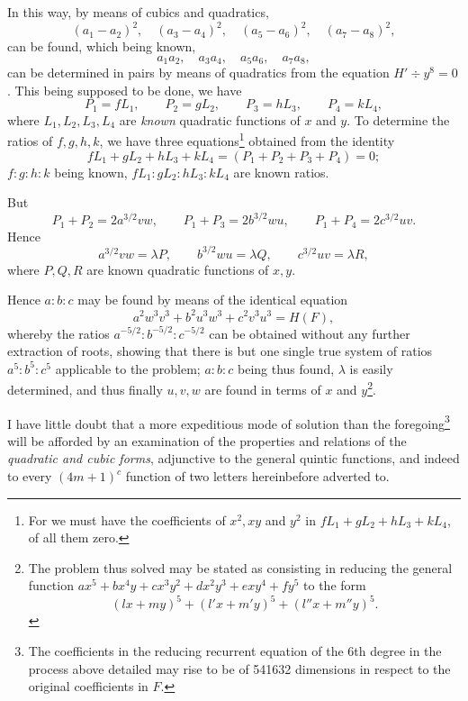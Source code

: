 \documentclass[11pt]{article}
\newcommand{\sourcepage}[1]{\marginpar{\scriptsize p.~#1}}
\begin{document}
{{In this way, by means of cubics and quadratics,
\[
 (a_1-a_2)^2,\quad (a_3-a_4)^2,\quad (a_5-a_6)^2,\quad (a_7-a_8)^2,
\]
can be found, which being known,
\[
 a_1a_2,\quad a_3a_4,\quad a_5a_6,\quad a_7a_8,
\]
can be determined in pairs by means of quadratics from the equation $H'\div y^8=0$. This being supposed to be done, we have
\[
 P_1=fL_1,\qquad P_2=gL_2,\qquad P_3=hL_3,\qquad P_4=kL_4,
\]
where $L_1,L_2,L_3,L_4$ are \emph{known} quadratic functions of $x$ and $y$. To determine the ratios of $f,g,h,k$, we have three equations\footnote{For we must have the coefficients of $x^2,xy$ and $y^2$ in $fL_1+gL_2+hL_3+kL_4$, of all them zero.} obtained from the identity
\[
 fL_1+gL_2+hL_3+kL_4=(P_1+P_2+P_3+P_4)=0;
\]
$f:g:h:k$ being known, $fL_1:gL_2:hL_3:kL_4$ are known ratios.

But
\[
 P_1+P_2=2a^{3/2}vw,\qquad
 P_1+P_3=2b^{3/2}wu,\qquad
 P_1+P_4=2c^{3/2}uv.
\]
Hence
\[
 a^{3/2}vw=\lambda P,\qquad
 b^{3/2}wu=\lambda Q,\qquad
 c^{3/2}uv=\lambda R,
\]
where $P,Q,R$ are known quadratic functions of $x,y$.

\sourcepage{195}
Hence $a:b:c$ may be found by means of the identical equation
\[
 a^2w^3v^3+b^2u^3w^3+c^2v^3u^3=H(F),
\]
whereby the ratios $a^{-5/2}:b^{-5/2}:c^{-5/2}$ can be obtained without any further extraction of roots, showing that there is but one single true system of ratios $a^5:b^5:c^5$ applicable to the problem; $a:b:c$ being thus found, $\lambda$ is easily determined, and thus finally $u,v,w$ are found in terms of $x$ and $y$\footnote{The problem thus solved may be stated as consisting in reducing the general function $ax^5+bx^4y+cx^3y^2+dx^2y^3+exy^4+fy^5$ to the form
\[
 (lx+my)^5+(l'x+m'y)^5+(l''x+m''y)^5.
\]}.

I have little doubt that a more expeditious mode of solution than the foregoing\footnote{The coefficients in the reducing recurrent equation of the 6th degree in the process above detailed may rise to be of 541632 dimensions in respect to the original coefficients in $F$.} will be afforded by an examination of the properties and relations of the \emph{quadratic and cubic forms}, adjunctive to the general quintic functions, and indeed to every $(4m+1)^c$ function of two letters hereinbefore adverted to.

}}
\end{document}

